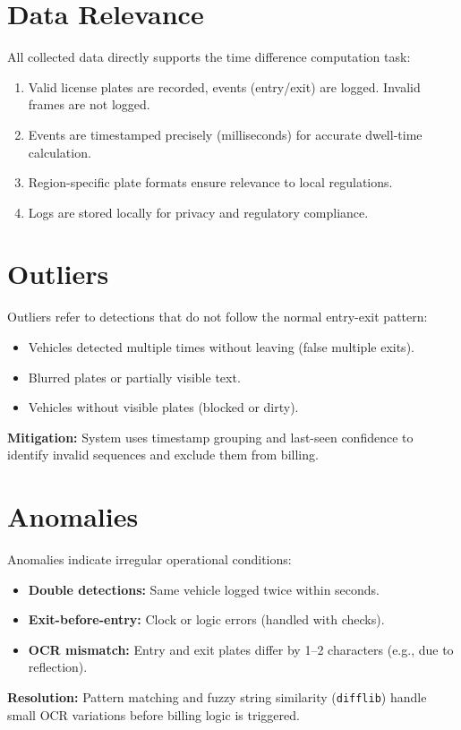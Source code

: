 \section{Data Relevance}
All collected data directly supports the time difference computation task:
\begin{enumerate}
	\item Valid license plates are recorded, events (entry/exit) are logged. Invalid frames are not logged.
	\item Events are timestamped precisely (milliseconds) for accurate dwell-time calculation.
	\item Region-specific plate formats ensure relevance to local regulations.
	\item Logs are stored locally for privacy and regulatory compliance.
\end{enumerate}

\section{Outliers}
Outliers refer to detections that do not follow the normal entry-exit pattern:
\begin{itemize}
	\item Vehicles detected multiple times without leaving (false multiple exits).
	\item Blurred plates or partially visible text.
	\item Vehicles without visible plates (blocked or dirty).
\end{itemize}
\textbf{Mitigation:} System uses timestamp grouping and last-seen confidence to identify invalid sequences and exclude them from billing.

\section{Anomalies}
Anomalies indicate irregular operational conditions:
\begin{itemize}
	\item \textbf{Double detections:} Same vehicle logged twice within seconds.
	\item \textbf{Exit-before-entry:} Clock or logic errors (handled with checks).
	\item \textbf{\ac{OCR} mismatch:} Entry and exit plates differ by 1–2 characters (e.g., due to reflection).
\end{itemize}
\textbf{Resolution:} Pattern matching and fuzzy string similarity (\texttt{difflib}) handle small \ac{OCR} variations before billing logic is triggered.

